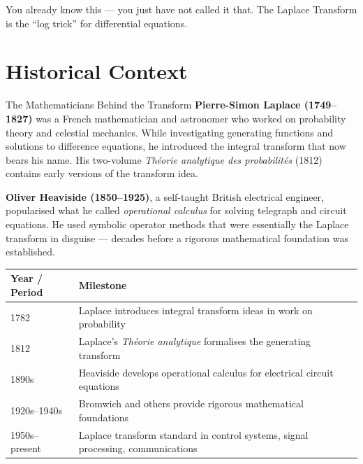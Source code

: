 \documentclass[12pt,a4paper]{article}
\begin{document}
\medskip
You already know this --- you just have not called it that.  The Laplace
Transform is the ``log trick'' for differential equations.

\section{Historical Context}

\begin{infobox}{The Mathematicians Behind the Transform}
\textbf{Pierre-Simon Laplace (1749--1827)} was a French mathematician and
astronomer who worked on probability theory and celestial mechanics.  While
investigating generating functions and solutions to difference equations, he
introduced the integral transform that now bears his name.  His two-volume
\emph{Th\'{e}orie analytique des probabilit\'{e}s} (1812) contains early
versions of the transform idea.

\textbf{Oliver Heaviside (1850--1925)}, a self-taught British electrical
engineer, popularised what he called \emph{operational calculus} for solving
telegraph and circuit equations.  He used symbolic operator methods that were
essentially the Laplace transform in disguise --- decades before a rigorous
mathematical foundation was established.

\medskip
\begin{center}
\begin{tabular}{@{}ll@{}}
\toprule
\textbf{Year / Period} & \textbf{Milestone} \\
\midrule
1782 & Laplace introduces integral transform ideas in work on probability \\
1812 & Laplace's \emph{Th\'{e}orie analytique} formalises the generating transform \\
1890s & Heaviside develops operational calculus for electrical circuit equations \\
1920s--1940s & Bromwich and others provide rigorous mathematical foundations \\
1950s--present &
  Laplace transform standard in control systems, signal processing,
  communications \\
\bottomrule
\end{tabular}
\end{center}
\end{infobox}

\end{document}
